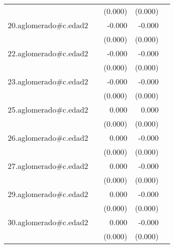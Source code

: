 {\begin{longtable}{l*{4}{D{.}{.}{-1}}}
            &                     &     (0.000)         &     (0.000)         &                     \\
\addlinespace
20.aglomerado#c.edad2&                     &      -0.000         &      -0.000\sym{*}  &                     \\
            &                     &     (0.000)         &     (0.000)         &                     \\
\addlinespace
22.aglomerado#c.edad2&                     &      -0.000         &      -0.000\sym{***}&                     \\
            &                     &     (0.000)         &     (0.000)         &                     \\
\addlinespace
23.aglomerado#c.edad2&                     &      -0.000         &      -0.000\sym{**} &                     \\
            &                     &     (0.000)         &     (0.000)         &                     \\
\addlinespace
25.aglomerado#c.edad2&                     &       0.000\sym{***}&       0.000\sym{**} &                     \\
            &                     &     (0.000)         &     (0.000)         &                     \\
\addlinespace
26.aglomerado#c.edad2&                     &       0.000         &      -0.000         &                     \\
            &                     &     (0.000)         &     (0.000)         &                     \\
\addlinespace
27.aglomerado#c.edad2&                     &       0.000         &      -0.000\sym{*}  &                     \\
            &                     &     (0.000)         &     (0.000)         &                     \\
\addlinespace
29.aglomerado#c.edad2&                     &       0.000         &      -0.000         &                     \\
            &                     &     (0.000)         &     (0.000)         &                     \\
\addlinespace
30.aglomerado#c.edad2&                     &       0.000         &      -0.000         &                     \\
            &                     &     (0.000)         &     (0.000)         &                     \\

\end{longtable}}

